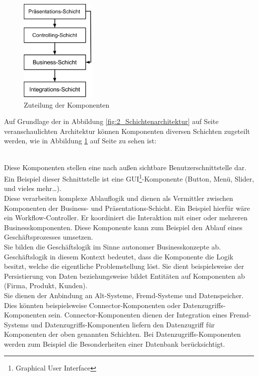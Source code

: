 \begin{figure}[h]
\centering
\includegraphics[height=5.0cm]{images/Schichtenarchitektur.png}
\caption[
Zuteilung der Komponenten
]{Zuteilung der Komponenten}
\label{fig:2_Schichtenarchitektur2}
\end{figure}

Auf Grundlage der in Abbildung \ref{fig:2_Schichtenarchitektur} auf Seite \pageref{fig:2_Schichtenarchitektur} veranschaulichten Architektur können Komponenten diversen Schichten zugeteilt werden, wie in Abbildung \ref{fig:2_Schichtenarchitektur2} auf Seite \pageref{fig:2_Schichtenarchitektur2} zu sehen ist:
\begin{enumerate}
 \hfill \\
Diese Komponenten stellen eine nach außen sichtbare Benutzerschnittstelle dar. Ein Beispiel dieser Schnittstelle ist eine GUI\footnote{Graphical User Interface}-Komponente (Button, Menü, Slider, und vieles mehr\dots).
 \hfill \\
Diese verarbeiten komplexe Ablauflogik und dienen als Vermittler zwischen Komponenten der Business- und Präsentations-Schicht. Ein Beispiel hierfür wäre ein Workflow-Controller. Er koordiniert die Interaktion mit einer oder mehreren Businesskomponenten. Diese Komponente kann zum Beispiel den Ablauf eines Geschäftsprozesses umsetzen.
 \hfill \\
Sie bilden die Geschäftslogik im Sinne autonomer Businesskonzepte ab. Geschäftslogik in diesem Kontext bedeutet, dass die Komponente die Logik besitzt, welche die eigentliche Problemstellung löst. Sie dient beispielsweise der Persistierung von Daten beziehungsweise bildet Entitäten auf Komponenten ab (Firma, Produkt, Kunden).
 \hfill \\
Sie dienen der Anbindung an Alt-Systeme, Fremd-Systeme und Datenspeicher. Dies könnten beispielsweise Connector-Komponenten oder Datenzugriffs-Komponenten sein. Connector-Komponenten dienen der Integration eines Fremd-Systems und Datenzugriffs-Komponenten liefern den Datenzugriff für Komponenten der oben genannten Schichten. Bei Datenzugriffs-Komponenten werden zum Beispiel die Besonderheiten einer Datenbank berücksichtigt.
\end{enumerate}

